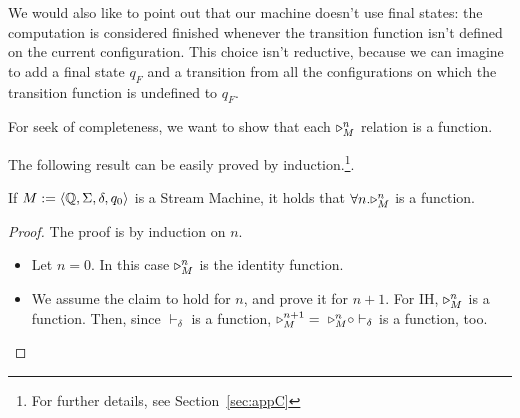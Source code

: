 \begin{conditional}{\notappendix}
    We would also like to point out that
    our machine doesn't use final states: the computation
    is considered finished whenever the transition function isn't defined on
    the current configuration. This choice isn't reductive, because we can imagine
    to add a final state $q_F$ and a transition from all the configurations
    on which the transition function is undefined to $q_F$.

    For seek of completeness, we want to show that each $\triangleright^{n}_{M}$ relation
    is a function.
  \end{conditional}

  \begin{conditional}{\shortonly}
    The following result can be easily proved by induction.\footnote{For
    further details, see Section~\ref{sec:appC}}.
  \end{conditional}

  \begin{prop} If $M:=\langle \mathbb{Q},
  \Sigma, \delta, q_0\rangle$ is a Stream Machine, it holds that
  $\forall n.\triangleright^{n}_{M}$ is
  a function.
  \end{prop}


  \begin{conditional}{\appendixorsup}
    \begin{proof}
    The proof is by induction on $n$.
    \begin{itemize}
    \itemsep0em
    \item Let $n=0$. In this case $\triangleright^{n}_{M}$
    is the identity function.

    \item We assume the claim to hold for $n$, and
    prove it for $n+1$. For IH, $\triangleright^{n}_{M}$
    is a function. Then, since
    $\vdash_{\delta}$ is a function,  $\triangleright^{n+1}_{M}
    = \ \triangleright^{n}_{M} \circ
    \vdash_{\delta}$ is a function, too.

    \end{itemize}
    \end{proof}
  \end{conditional}


